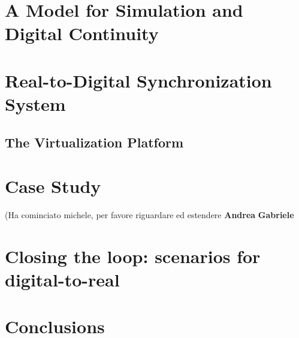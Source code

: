 \documentclass{riverk}
\begin{document}
\section{A Model for Simulation and Digital Continuity}\label{sec:model}




\section{Real-to-Digital Synchronization System}\label{sec:r2ds}


\subsection{The Virtualization Platform}\label{sec:architecture}




\section{Case Study}\label{sec:caseStudy}
(Ha cominciato michele, per favore riguardare ed estendere \textbf{Andrea} \textbf{Gabriele}


\section{Closing the loop: scenarios for digital-to-real}\label{sec:d2rs}


\section{Conclusions}\label{sec:conclusions}







\end{document}
